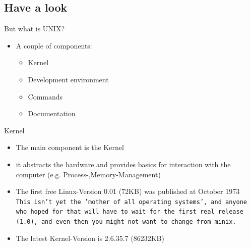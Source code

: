 \documentclass[hyperref={pdfpagelabels=false}]{beamer}
\begin{document}
    \subsection{Have a look}
        \begin{frame}{But what is UNIX?}
            \begin{itemize}
                \item<1-> A couple of components:
                \begin{itemize}
                    \item<1-> Kernel   
                    \item<2-> Development environment
                    \item<3-> Commands
                    \item<4-> Documentation
                \end{itemize}
            \end{itemize}
        \end{frame}
        \begin{frame}{Kernel}
        \begin{itemize}
            \item<1-> The main component is the Kernel
            \item<2-> it abstracts the hardware and provides basics for interaction with the computer (e.g. Process-,Memory-Management)
            \item<3-> The first free Linux-Version 0.01 (72KB) was published at October 1973 \\
                \texttt{This isn't yet the 'mother of all operating systems', and anyone who
hoped for that will have to wait for the first real release (1.0), and
even then you might not want to change from minix.}
            \item<4-> The latest Kernel-Version is 2.6.35.7 (86232KB)
        \end{itemize}
        \end{frame}
\end{document}
